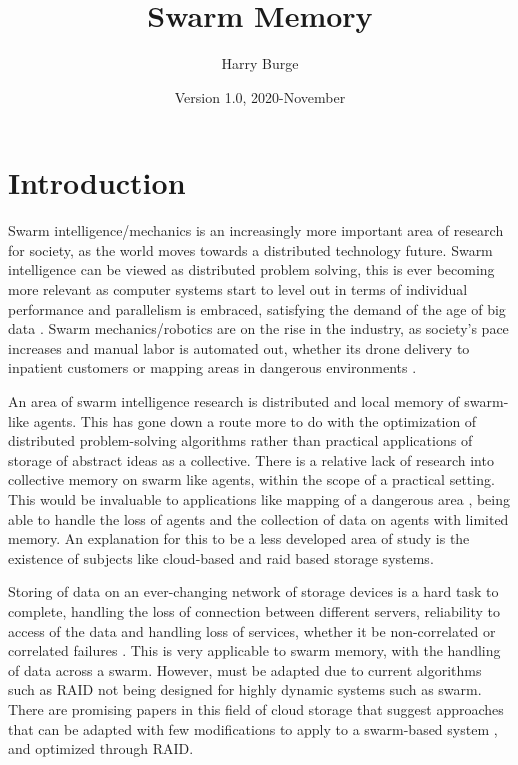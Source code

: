 \documentclass{UoYCSproject}
\author{Harry Burge}
\title{Swarm Memory}
\date{Version 1.0, 2020-November}
\begin{document}
\maketitle
\listoffigures
\listoftables



\begin{summary}

\end{summary}


\chapter{Introduction}
\label{cha:Introduction}

Swarm intelligence/mechanics is an increasingly more important area of research for society, as the world moves towards a distributed technology future.
Swarm intelligence can be viewed as distributed problem solving\cite{Cognitive maps mine detection, Swarm intellegiegence}, this is ever becoming more relevant as computer systems start to level out in terms of individual performance \cite{CPU speed} and parallelism is embraced, satisfying the demand of the age of big data \cite{Avalability storage}.
Swarm mechanics/robotics are on the rise in the industry, as society's pace increases and manual labor is automated out, whether its drone delivery to inpatient customers or mapping areas in dangerous environments \cite{Swarm robotics reviewed}.

An area of swarm intelligence research is distributed and local memory of swarm-like agents.
This has gone down a route more to do with the optimization of distributed problem-solving algorithms rather than practical applications of storage of abstract ideas as a collective.
There is a relative lack of research into collective memory on swarm like agents, within the scope of a practical setting.
This would be invaluable to applications like mapping of a dangerous area \cite{Cognitive maps mine detection}, being able to handle the loss of agents and the collection of data on agents with limited memory.
An explanation for this to be a less developed area of study is the existence of subjects like cloud-based and raid based storage systems.

Storing of data on an ever-changing network of storage devices is a hard task to complete, handling the loss of connection between different servers, reliability to access of the data and handling loss of services, whether it be non-correlated or correlated failures \cite{Avalability storage}.
This is very applicable to swarm memory, with the handling of data across a swarm. 
However, must be adapted due to current algorithms such as RAID not being designed for highly dynamic systems such as swarm.
There are promising papers in this field of cloud storage that suggest approaches that can be adapted with few modifications to apply to a swarm-based system \cite{Distributed Storage}, and optimized through RAID.
\end{document}
